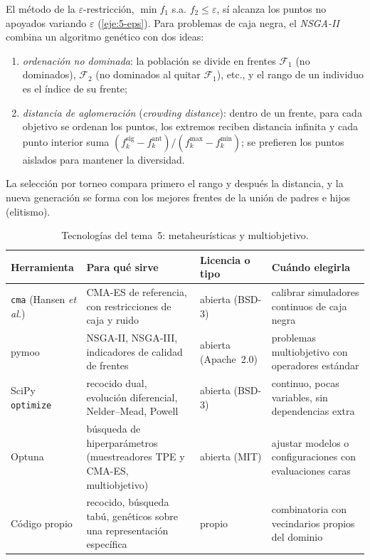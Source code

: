 El método de la $\varepsilon$-restricción, $\min f_1$ s.a. $f_2\le\varepsilon$, sí alcanza los puntos no apoyados variando $\varepsilon$ (\cref{eje:5-eps}). Para problemas de caja negra, el \emph{NSGA-II}~\cite{nsga2} combina un algoritmo genético con dos ideas:
\begin{enumerate}[label=(\alph*)]
  \item \emph{ordenación no dominada}: la población se divide en frentes $\mathcal{F}_1$ (no dominados), $\mathcal{F}_2$ (no dominados al quitar $\mathcal{F}_1$), etc., y el rango de un individuo es el índice de su frente;
  \item \emph{distancia de aglomeración} (\emph{crowding distance}): dentro de un frente, para cada objetivo se ordenan los puntos, los extremos reciben distancia infinita y cada punto interior suma $(f_k^{\text{sig}}-f_k^{\text{ant}})/(f_k^{\max}-f_k^{\min})$; se prefieren los puntos aislados para mantener la diversidad.
\end{enumerate}
La selección por torneo compara primero el rango y después la distancia, y la nueva generación se forma con los mejores frentes de la unión de padres e hijos (elitismo).

\addtocounter{definicion}{1}%

\addtocounter{figure}{1}%

\begin{table}[h]
\centering\small
\caption{Tecnologías del tema~5: metaheurísticas y multiobjetivo.}\label{tab:tec5}
\begin{tabularx}{\textwidth}{@{}l>{\raggedright\arraybackslash}X>{\raggedright\arraybackslash}p{2.2cm}>{\raggedright\arraybackslash}X@{}}
\toprule
Herramienta & Para qué sirve & Licencia o tipo & Cuándo elegirla \\
\midrule
\texttt{cma} (Hansen \emph{et al.}) & CMA-ES de referencia, con restricciones de caja y ruido & abierta (BSD-3) & calibrar simuladores continuos de caja negra \\
pymoo~\cite{pymoo} & NSGA-II, NSGA-III, indicadores de calidad de frentes & abierta (Apache~2.0) & problemas multiobjetivo con operadores estándar \\
SciPy \texttt{optimize} & recocido dual, evolución diferencial, Nelder--Mead, Powell & abierta (BSD-3) & continuo, pocas variables, sin dependencias extra \\
Optuna & búsqueda de hiperparámetros (muestreadores TPE y CMA-ES, multiobjetivo) & abierta (MIT) & ajustar modelos o configuraciones con evaluaciones caras \\
Código propio & recocido, búsqueda tabú, genéticos sobre una representación específica & propio & combinatoria con vecindarios propios del dominio \\
\bottomrule
\end{tabularx}
\end{table}

\addtocounter{definicion}{1}%

